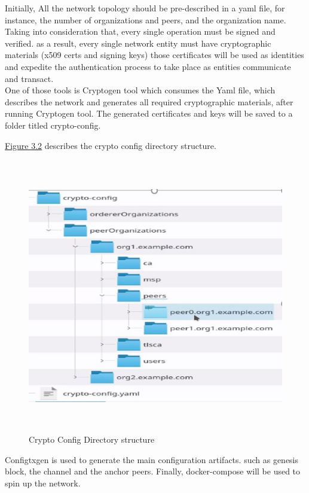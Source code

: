 Initially, All the network topology should be pre-described in a yaml file, for instance, the number of organizations and peers, and the organization name. 
Taking into consideration that, every single operation must be signed and verified. as a result, every single network entity must have cryptographic materials (x509 certs and signing keys) those certificates will be used as identities and expedite the authentication process to take place as entities communicate and transact.  \\ 
One of those tools is Cryptogen tool which consumes the Yaml file, which describes the network and generates all required cryptographic materials, after running Cryptogen tool. The generated certificates and keys will be saved to a folder titled crypto-config.

\clearpage 

\noindent \hyperref[fig:cryptoconfig]{Figure 3.2} describes the crypto config directory structure.  
 \begin{figure}[H]
\includegraphics[width=15cm,height=12cm]{images/cryptoconfig.jpg}
\caption{Crypto Config Directory structure}
\label{fig:cryptoconfig}
\end{figure}


\noindent Configtxgen is used to generate the main configuration artifacts. such as genesis block, the channel and the anchor peers. 
Finally, docker-compose will be used to spin up the network. 


